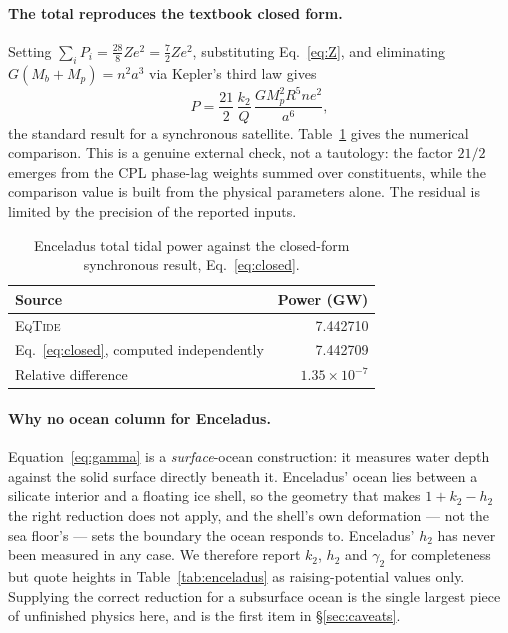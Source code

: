 \documentclass[11pt]{article}
\newcommand{\eqtide}{\textsc{EqTide}}
\begin{document}
\paragraph{The total reproduces the textbook closed form.} Setting
$\sum_i P_i = \tfrac{28}{8}Ze^2 = \tfrac72 Ze^2$, substituting
Eq.~\eqref{eq:Z}, and eliminating $G(M_b+M_p) = n^2a^3$ via Kepler's third law
gives
\begin{equation}
  P = \frac{21}{2}\,\frac{k_2}{Q}\,
      \frac{G M_p^2 R^5 n e^2}{a^6},
  \label{eq:closed}
\end{equation}
the standard result for a synchronous satellite.
Table~\ref{tab:enceladusclosed} gives the numerical comparison. This is a
genuine external check, not a tautology: the factor $21/2$ emerges from the
CPL phase-lag weights summed over constituents, while the comparison value is
built from the physical parameters alone. The residual is limited by the
precision of the reported inputs.

\begin{table}[h]
\centering
\caption{Enceladus total tidal power against the closed-form synchronous
result, Eq.~\eqref{eq:closed}.}
\label{tab:enceladusclosed}
\begin{tabular}{lr}
\toprule
Source & Power (GW) \\
\midrule
\eqtide & 7.442710 \\
Eq.~\eqref{eq:closed}, computed independently & 7.442709 \\
Relative difference & $1.35\times10^{-7}$ \\
\bottomrule
\end{tabular}
\end{table}

\paragraph{Why no ocean column for Enceladus.} Equation~\eqref{eq:gamma} is a
\emph{surface}-ocean construction: it measures water depth against the solid
surface directly beneath it. Enceladus' ocean lies between a silicate interior
and a floating ice shell, so the geometry that makes $1+k_2-h_2$ the right
reduction does not apply, and the shell's own deformation --- not the sea
floor's --- sets the boundary the ocean responds to. Enceladus' $h_2$ has
never been measured in any case. We therefore report $k_2$, $h_2$ and
$\gamma_2$ for completeness but quote heights in Table~\ref{tab:enceladus} as
raising-potential values only. Supplying the correct reduction for a
subsurface ocean is the single largest piece of unfinished physics here, and
is the first item in \S\ref{sec:caveats}.
\end{document}
